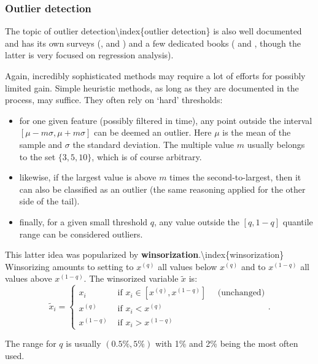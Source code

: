 \subsubsection{Outlier detection}

The topic of outlier detection{\textbackslash}index\{outlier detection\} is also well documented and has its own surveys (\cite{hodge2004survey}, \cite{chandola2009anomaly} and \cite{gupta2014outlier}) and a few dedicated books (\cite{aggarwal2013outlier} and \cite{rousseeuw2005robust}, though the latter is very focused on regression analysis).

Again, incredibly sophisticated methods may require a lot of efforts for possibly limited gain. Simple heuristic methods, as long as they are documented in the process, may suffice. They often rely on `hard' thresholds:

\begin{itemize}
\item for one given feature (possibly filtered in time), any point outside the interval $[\mu -m\sigma, \mu+m\sigma]$ can be deemed an outlier. Here $\mu$ is the mean of the sample and $\sigma$ the standard deviation. The multiple value $m$ usually belongs to the set $\{3, 5, 10\}$, which is of course arbitrary.
\item likewise, if the largest value is above $m$ times the second-to-largest, then it can also be classified as an outlier (the same reasoning applied for the other side of the tail).
\item finally, for a given small threshold $q$, any value outside the $[q,1 -q]$ quantile range can be considered outliers.
\end{itemize}

This latter idea was popularized by \textbf{winsorization}.{\textbackslash}index\{winsorization\} Winsorizing amounts to setting to $x^{(q)}$ all values below $x^{(q)}$ and to $x^{(1 -q)}$ all values above $x^{(1 -q)}$. The winsorized variable $\tilde{x}$ is:
\begin{equation}
\tilde{x}_i=\left\{\begin{array}{ll}
x_i & \text{ if }  x_i \in [x^{(q)},x^{(1-q)}] \quad \text{ (unchanged)}\\
x^{(q)} & \text{ if }  x_i < x^{(q)} \\
x^{(1-q)} & \text{ if }  x_i > x^{(1-q)}
 \end{array} \right. .
\end{equation}

The range for $q$ is usually $(0.5\%, 5\%)$ with 1\% and 2\% being the most often used.

